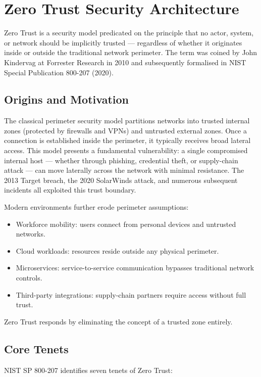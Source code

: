\section{Zero Trust Security Architecture}

Zero Trust is a security model predicated on the principle that no actor, system, or network should be implicitly trusted — regardless of whether it originates inside or outside the traditional network perimeter. The term was coined by John Kindervag at Forrester Research in 2010 and subsequently formalised in NIST Special Publication 800-207 (2020).

\subsection{Origins and Motivation}

The classical perimeter security model partitions networks into trusted internal zones (protected by firewalls and VPNs) and untrusted external zones. Once a connection is established inside the perimeter, it typically receives broad lateral access. This model presents a fundamental vulnerability: a single compromised internal host — whether through phishing, credential theft, or supply-chain attack — can move laterally across the network with minimal resistance. The 2013 Target breach, the 2020 SolarWinds attack, and numerous subsequent incidents all exploited this trust boundary.

Modern environments further erode perimeter assumptions:
\begin{itemize}
    \item Workforce mobility: users connect from personal devices and untrusted networks.
    \item Cloud workloads: resources reside outside any physical perimeter.
    \item Microservices: service-to-service communication bypasses traditional network controls.
    \item Third-party integrations: supply-chain partners require access without full trust.
\end{itemize}

Zero Trust responds by eliminating the concept of a trusted zone entirely.

\subsection{Core Tenets}

NIST SP 800-207 identifies seven tenets of Zero Trust:

